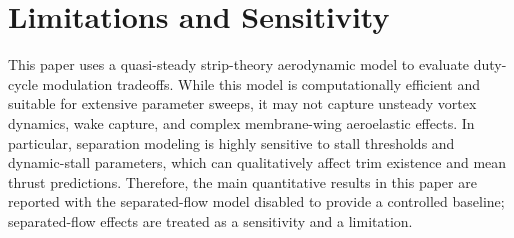 \section{Limitations and Sensitivity}
This paper uses a quasi-steady strip-theory aerodynamic model to evaluate duty-cycle modulation tradeoffs.
While this model is computationally efficient and suitable for extensive parameter sweeps, it may not capture unsteady vortex dynamics, wake capture, and complex membrane-wing aeroelastic effects.
In particular, separation modeling is highly sensitive to stall thresholds and dynamic-stall parameters, which can qualitatively affect trim existence and mean thrust predictions.
Therefore, the main quantitative results in this paper are reported with the separated-flow model disabled to provide a controlled baseline; separated-flow effects are treated as a sensitivity and a limitation.
